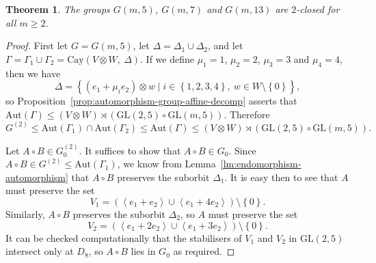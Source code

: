 \documentclass[10pt]{amsart}
\theoremstyle{definition}
\theoremstyle{plain}
\theoremstyle{plain}
\theoremstyle{plain}
\newtheorem{theorem}[theorem]{Theorem}
\theoremstyle{plain}
\newcommand{\Aut}{\mathrm{Aut}}
\newcommand{\Cay}{\mathrm{Cay}}
\newcommand{\GL}{\mathrm{GL}}
\begin{document}
\begin{theorem} \label{thm:2-closed}
The groups $G{\left(m, 5 \right)}$, $G{\left(m, 7 \right)}$ and $G{\left(m, 13 \right)}$ are $2$-closed for all $m \geqslant 2$.
\end{theorem}
\begin{proof}
First let $G = G{\left(m, 5 \right)}$, let $\Delta = \Delta_1 \cup \Delta_2$, and let $\Gamma = \Gamma_1 \cup \Gamma_2 = \Cay{\left(V \otimes W,\ \Delta \right)}$. If we define $\mu_1 = 1$, $\mu_2 = 2$, $\mu_3 = 3$ and $\mu_4 = 4$, then we have
\begin{displaymath}
    \Delta = {\left\{\left(e_1 + \mu_i e_2 \right) \otimes w \mid i \in {\left\{1, 2, 3, 4 \right\}},\ w \in W \setminus \left\{0 \right\}\right\}},
\end{displaymath}
so Proposition~\ref{prop:automorphism-group-affine-decomp} asserts that $\Aut{\left(\Gamma \right)} \leqslant \left(V \otimes W \right) \rtimes \left(\GL{\left(2, 5 \right)} \circ \GL{\left(m, 5 \right)}\right)$. Therefore
\begin{displaymath}
    G^{\left(2 \right)} \leqslant \Aut{\left(\Gamma_1 \right)} \cap \Aut{\left(\Gamma_2 \right)} \leqslant \Aut{\left(\Gamma \right)} \leqslant \left(V \otimes W \right) \rtimes {\left(\GL{\left(2, 5 \right)} \circ \GL{\left(m, 5 \right)}\right)}.
\end{displaymath}

Let $A \circ B \in G^{\left(2 \right)}_0$. It suffices to show that $A \circ B \in G_0$. Since $A \circ B \in G^{\left(2 \right)} \leqslant \Aut{\left(\Gamma_1 \right)}$, we know from Lemma~\ref{lm:endomorphism-automorphism} that $A \circ B$ preserves the suborbit $\Delta_1$. It is easy then to see that $A$ must preserve the set
\begin{displaymath}
    V_1 = \left(\left<e_1 + e_2 \right> \cup \left<e_1 + 4 e_2 \right> \right) \setminus {\left\{0 \right\}}.
\end{displaymath}
Similarly, $A \circ B$ preserves the suborbit $\Delta_2$, so $A$ must preserve the set
\begin{displaymath}
    V_2 = \left(\left<e_1 + 2 e_2 \right> \cup \left<e_1 + 3 e_2 \right> \right) \setminus {\left\{0 \right\}}.
\end{displaymath}
It can be checked computationally that the stabilisers of $V_1$ and $V_2$ in $\GL{\left(2, 5 \right)}$ intersect only at $D_8$, so $A \circ B$ lies in $G_0$ as required.


\end{proof}
\end{document}
